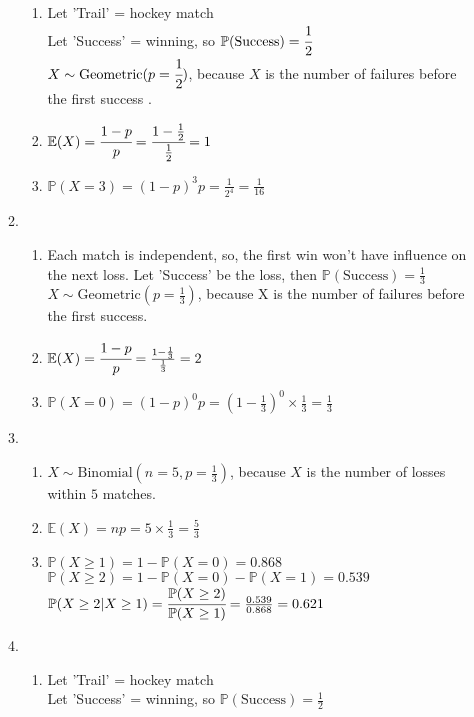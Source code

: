 \documentclass[12pt, oneside, a4paper]{article}
\begin{document}
\begin{enumerate}
\begin{enumerate}[label = (\alph*)]
\begin{enumerate}[label = (\roman*)]
				\item Let 'Trail' = hockey match\\
				Let 'Success' = winning, so $\mathbb{P}(\text{Success}) = \cfrac{1}{2}$\\
				$X \sim \text{Geometric}(p = \cfrac{1}{2})$, because $X$ is the number of failures before the first success .  
				\item $\mathbb{E}(X) = \cfrac{1-p}{p} = \cfrac{1-\frac{1}{2}}{\frac{1}{2}} = 1$
				\item $\mathbb{P}(X = 3) = (1-p)^3 p = \frac{1}{2^4} = \frac{1}{16}$
			\end{enumerate}
			\item %
						\begin{enumerate}[label = (\roman*)]
				\item Each match is independent, so, the first win won't have influence on the next loss. 
				Let 'Success' be the loss, then $\mathbb{P}(\text{Success}) = \frac{1}{3}$\\
				$X \sim \text{Geometric}(p = \frac{1}{3})$, because X is the number of failures before the first success. 
				\item $\mathbb{E}(X) = \cfrac{1-p}{p} = \frac{1-\frac{1}{3}}{\frac{1}{3}} = 2$
				\item $\mathbb{P}(X = 0) = (1-p)^0p = (1-\frac{1}{3})^0 \times \frac{1}{3} = \frac{1}{3}$
			\end{enumerate}
		\item %
					\begin{enumerate}[label = (\roman*)]
			\item $X \sim \text{Binomial}(n = 5, p = \frac{1}{3})$, because $X$ is the number of losses within $5$ matches.
			\item $\mathbb{E}(X) = np = 5 \times \frac{1}{3} = \frac{5}{3}$
			\item 
			$\mathbb{P}(X \geq 1) = 1 - \mathbb{P}(X=0) = 0.868$\\
			$\mathbb{P}(X \geq 2) = 1- \mathbb{P}(X = 0) - \mathbb{P}(X = 1) = 0.539 $\\
			$\mathbb{P}(X\geq 2 | X \geq 1) = \cfrac{\mathbb{P}(X\geq 2)}{\mathbb{P}(X\geq 1)} = \frac{0.539}{0.868}  = 0.621$
		\end{enumerate}
		\item %
					\begin{enumerate}[label = (\roman*)]
			\item Let 'Trail' = hockey match\\
			Let 'Success' = winning, so $\mathbb{P}(\text{Success}) = \frac{1}{2}$\\

\end{enumerate}
\end{enumerate}
\end{enumerate}
\end{document}
